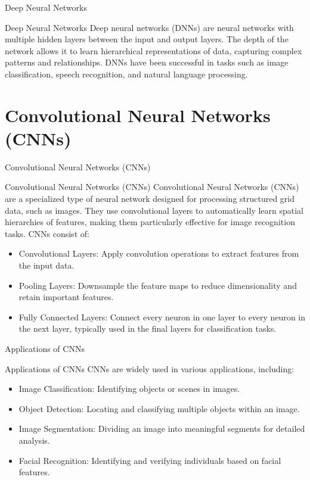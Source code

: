 \documentclass[hyperref={pdfpagelabels=false},aspectratio=169]{beamer}
\begin{document}
\begin{frame}[label={sec:orgb0bee0c}]{Deep Neural Networks}
\begin{block}{Deep Neural Networks}
Deep neural networks (DNNs) are neural networks with multiple hidden layers between the input and output layers. The depth of the network allows it to learn hierarchical representations of data, capturing complex patterns and relationships. DNNs have been successful in tasks such as image classification, speech recognition, and natural language processing.
\end{block}
\end{frame}
\section[CNNs]{Convolutional Neural Networks (CNNs)}
\label{sec:org6cd92e8}
\begin{frame}[label={sec:org9a66191}]{Convolutional Neural Networks (CNNs)}
\begin{block}{Convolutional Neural Networks (CNNs)}
Convolutional Neural Networks (CNNs) are a specialized type of neural network designed for processing structured grid data, such as images. They use convolutional layers to automatically learn spatial hierarchies of features, making them particularly effective for image recognition tasks. CNNs consist of:
\begin{itemize}
\item \alert{Convolutional Layers}: Apply convolution operations to extract features from the input data.
\item \alert{Pooling Layers}: Downsample the feature maps to reduce dimensionality and retain important features.
\item \alert{Fully Connected Layers}: Connect every neuron in one layer to every neuron in the next layer, typically used in the final layers for classification tasks.
\end{itemize}
\end{block}
\end{frame}
\begin{frame}[label={sec:org26b946d}]{Applications of CNNs}
\begin{block}{Applications of CNNs}
CNNs are widely used in various applications, including:
\begin{itemize}
\item \alert{Image Classification}: Identifying objects or scenes in images.
\item \alert{Object Detection}: Locating and classifying multiple objects within an image.
\item \alert{Image Segmentation}: Dividing an image into meaningful segments for detailed analysis.
\item \alert{Facial Recognition}: Identifying and verifying individuals based on facial features.
\end{itemize}
\end{block}
\end{frame}
\end{document}
